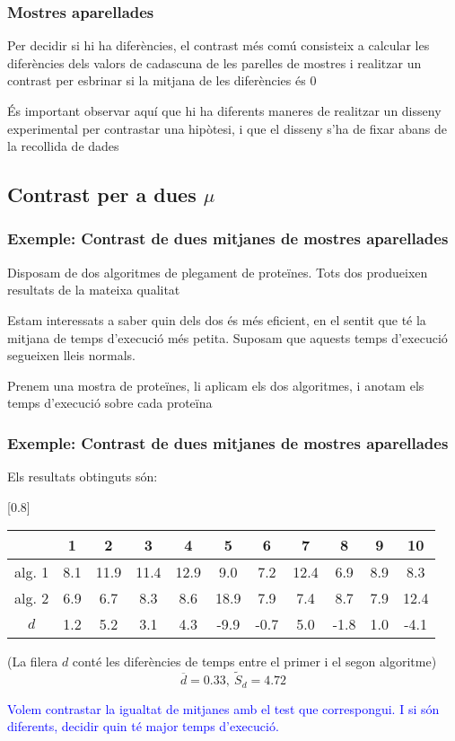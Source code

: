\documentclass[12pt,t]{beamer}
\newcommand{\blue}[1]{\textcolor{blue}{#1}}
\renewcommand{\emph}[1]{{\color{red}#1}}
\theoremstyle{plain}
\theoremstyle{definition}
\begin{document}
\begin{frame}
\frametitle{Mostres aparellades}

Per decidir si hi ha diferències, el contrast més comú consisteix a calcular les diferències
dels valors de cadascuna de les parelles de mostres i realitzar un
contrast per esbrinar si la mitjana de les diferències és  0

\pause \vspace*{1cm}



És important observar aquí que hi ha diferents maneres de
realitzar un disseny experimental per contrastar una hipòtesi, i que el disseny s'ha de fixar abans de la recollida de dades
\end{frame}

\subsection{Contrast  per a dues $\mu$}
\begin{frame}
\frametitle{Exemple: Contrast de dues mitjanes de mostres aparellades}

Disposam de dos algoritmes de plegament de proteïnes. Tots dos
produeixen resultats de la mateixa qualitat
\medskip

Estam interessats a saber quin dels dos és \emph{més eficient}, en el sentit que té la mitjana de temps d'execució
més petita. Suposam que aquests temps d'execució segueixen lleis normals.
\medskip

Prenem una mostra de proteïnes, li aplicam els dos algoritmes, i anotam els temps d'execució sobre cada proteïna
\end{frame}


\begin{frame}
\frametitle{Exemple: Contrast de dues mitjanes de mostres aparellades}
Els resultats obtinguts són:
\begin{table}
\centering
\scalebox{0.80}[0.8]{
\begin{tabular}{c|cccccccccc}
& 1 & 2 & 3 & 4 & 5 & 6 & 7 & 8 & 9 & 10\\
\hline
alg. 1  & 8.1 & 11.9 & 11.4 & 12.9 & 9.0 & 7.2 & 12.4 & 6.9 & 8.9 & 8.3\\
\hline
alg. 2 & 6.9 & 6.7 & 8.3 & 8.6 & 18.9 & 7.9 & 7.4 & 8.7 & 7.9 &
12.4\\
\hline
$d$ & 1.2 & 5.2 & 3.1 & 4.3 & -9.9 & -0.7 & 5.0 & -1.8 &
1.0 & -4.1
\end{tabular}

}
\end{table}
(La filera $d$ conté les diferències de temps entre el primer i el segon algoritme)
$$
\overline{d}=0.33,\ \widetilde{S}_d=4.72
$$
\smallskip

\blue{Volem contrastar la igualtat de mitjanes amb el test que correspongui. I si són diferents, decidir quin té major temps d'execució.}




\end{frame}
\end{document}
